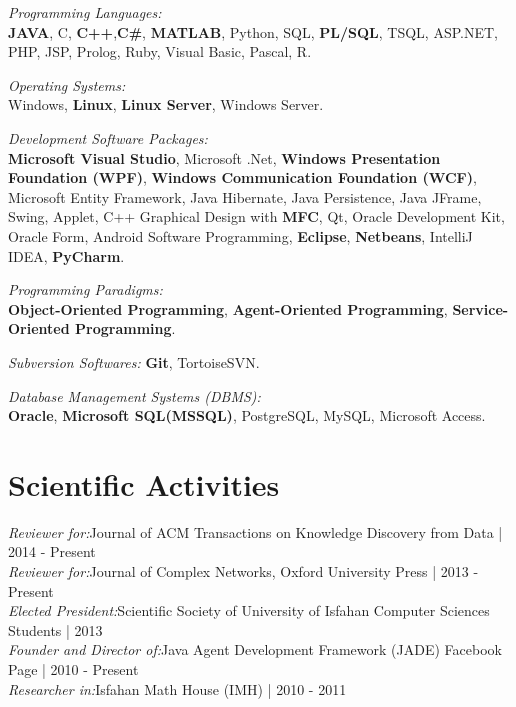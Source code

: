 \documentclass[letter]{res}
\begin{document}
\begin{resume}
\textit{Programming Languages:}\\
\textbf{JAVA}, C, \textbf{C++},\textbf{C\#}, \textbf{MATLAB}, Python, SQL, \textbf{PL/SQL}, TSQL, ASP.NET, PHP, JSP, Prolog, Ruby, Visual Basic, Pascal, R.
\vspace{-2mm}

\textit{Operating Systems:}\\
Windows, \textbf{Linux}, \textbf{Linux Server}, Windows Server.
\vspace{-2mm}

\textit{Development Software Packages:}\\
\textbf{Microsoft Visual Studio}, Microsoft .Net, \textbf{Windows Presentation Foundation (WPF)}, \textbf{Windows Communication Foundation (WCF)}, Microsoft Entity Framework,
Java Hibernate, Java Persistence, Java JFrame, Swing, Applet, C++ Graphical Design with \textbf{MFC}, Qt, Oracle Development Kit, Oracle Form, Android Software Programming, \textbf{Eclipse}, \textbf{Netbeans}, IntelliJ IDEA, \textbf{PyCharm}.\\
\vspace{-6mm}

\textit{Programming Paradigms:}\\
\textbf{Object-Oriented Programming}, \textbf{Agent-Oriented Programming}, \textbf{Service-Oriented Programming}.
\vspace{-6mm}

\textit{Subversion Softwares:} \textbf{Git}, TortoiseSVN.
\vspace{-2mm}
 
\textit{Database Management Systems (DBMS):}\\
\textbf{Oracle}, \textbf{Microsoft SQL(MSSQL)}, PostgreSQL, MySQL, Microsoft Access.
\vspace{-2mm}
 


\section{Scientific Activities}
{\sl Reviewer for:}Journal of ACM Transactions on Knowledge Discovery from Data | 2014 - Present\\
{\sl Reviewer for:}Journal of Complex Networks, Oxford University Press | 2013 - Present\\
{\sl Elected President:}Scientific Society of University of Isfahan Computer Sciences Students | 2013\\
{\sl Founder and Director of:}Java Agent Development Framework (JADE) Facebook Page | 2010 - Present\\
{\sl Researcher in:}Isfahan Math House (IMH) | 2010 - 2011



\end{resume}
\end{document}
